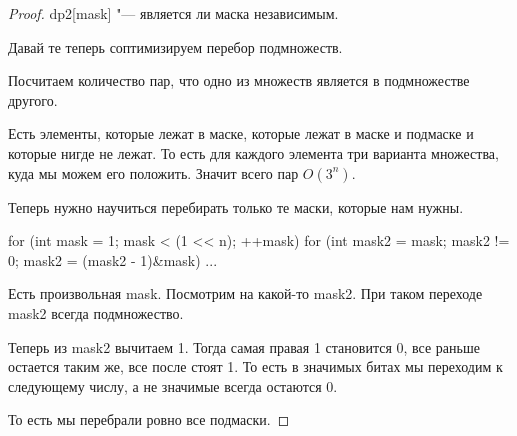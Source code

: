 \begin{enumerate}
\begin{proof}
    dp2[mask] "--- является ли маска независимым. 

    Давай те теперь соптимизируем перебор подмножеств. 
    
    Посчитаем количество пар, что одно из множеств является в подмножестве другого. 

    Есть  элементы, которые лежат в маске, которые лежат в маске и подмаске и которые нигде не лежат. То есть 
    для каждого элемента три варианта множества, куда мы можем его положить. Значит всего пар $O(3^n)$.
    
    Теперь нужно научиться перебирать только те маски, которые нам нужны.
    \begin{cppcode}
    for (int mask = 1; mask < (1 << n); ++mask) {
        for (int mask2 = mask; mask2 != 0; mask2 = (mask2 - 1)&mask) {
            ...
        }
    } 
    \end{cppcode} 

    Есть произвольная mask. Посмотрим на какой-то mask2. При таком переходе mask2 всегда подмножество. 

    Теперь из mask2 вычитаем 1. Тогда самая правая 1 становится 0, все раньше остается таким же, все после стоят 1. 
    То есть в значимых битах мы переходим к следующему числу, а не значимые всегда остаются 0.

    То есть  мы перебрали ровно все подмаски.
     
\end{proof}
\end{enumerate}
